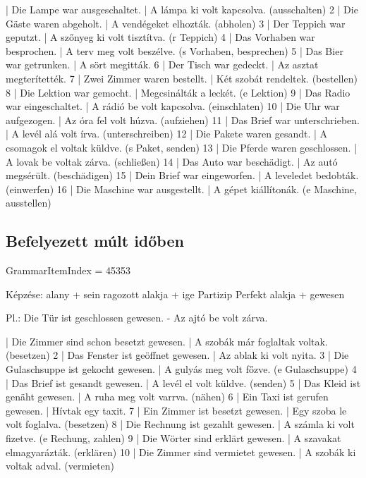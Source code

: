 \documentclass{article}
\newenvironment{desc}{\verbatim}{\endverbatim}
\newenvironment{exmp}{\verbatim}{\endverbatim}
\begin{document}
\begin{exmp}
1 | Die Lampe war ausgeschaltet. | A lámpa ki volt kapcsolva. (ausschalten)
2 | Die Gäste waren abgeholt. | A vendégeket elhozták. (abholen)
3 | Der Teppich war geputzt. | A szőnyeg ki volt tisztítva. (r Teppich)
4 | Das Vorhaben war besprochen. | A terv meg volt beszélve. (s Vorhaben, besprechen)
5 | Das Bier war getrunken. | A sört megitták.
6 | Der Tisch war gedeckt. | Az asztat megterítették.
7 | Zwei Zimmer waren bestellt. | Két szobát rendeltek. (bestellen)
8 | Die Lektion war gemocht. | Megcsinálták a leckét. (e Lektion)
9 | Das Radio war eingeschaltet. | A rádió be volt kapcsolva. (einschlaten)
10 | Die Uhr war aufgezogen. | Az óra fel volt húzva. (aufziehen)
11 | Das Brief war unterschrieben. | A levél alá volt írva. (unterschreiben)
12 | Die Pakete waren gesandt. | A csomagok el voltak küldve. (s Paket, senden)
13 | Die Pferde waren geschlossen. | A lovak be voltak zárva. (schließen)
14 | Das Auto war beschädigt. | Az autó megsérült. (beschädigen)
15 | Dein Brief war eingeworfen. | A leveledet bedobták. (einwerfen)
16 | Die Maschine war ausgestellt. | A gépet kiállítonák. (e Maschine, ausstellen)
\end{exmp}

\subsection{Befelyezett múlt időben}

GrammarItemIndex = 45353

\begin{desc}
Képzése:
alany + sein ragozott alakja + ige Partizip Perfekt alakja + gewesen

Pl.: Die Tür ist geschlossen gewesen. - Az ajtó be volt zárva.
\end{desc}

\begin{exmp}
1 | Die Zimmer sind schon besetzt gewesen. | A szobák már foglaltak voltak. (besetzen)
2 | Das Fenster ist geöffnet gewesen. | Az ablak ki volt nyita.
3 | Die Gulaschsuppe ist gekocht gewesen. | A gulyás meg volt főzve. (e Gulaschsuppe)
4 | Das Brief ist gesandt gewesen. | A levél el volt küldve. (senden)
5 | Das Kleid ist genäht gewesen. | A ruha meg volt varrva. (nähen)
6 | Ein Taxi ist gerufen gewesen. | Hívtak egy taxit.
7 | Ein Zimmer ist besetzt gewesen. | Egy szoba le volt foglalva. (besetzen)
8 | Die Rechnung ist gezahlt gewesen. | A számla ki volt fizetve. (e Rechung, zahlen)
9 | Die Wörter sind erklärt gewesen. | A szavakat elmagyarázták. (erklären)
10 | Die Zimmer sind vermietet gewesen. | A szobák ki voltak adval. (vermieten)
\end{exmp}
\end{document}
